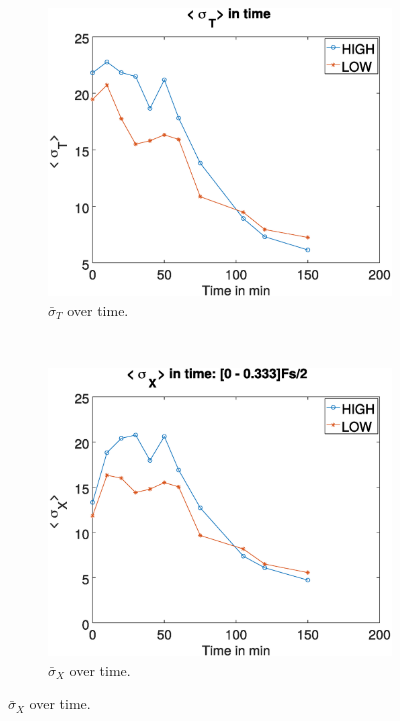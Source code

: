 \documentclass[review]{elsarticle}
\begin{document}
\begin{figure}[h!]
    \centering
    \begin{subfigure}[b]{0.475\textwidth}
        \includegraphics[width=\textwidth]{std-all.eps}
	\caption{$\bar{\sigma}_T$ over time.}
        \label{fig:allink}
    \end{subfigure}
    ~
    \begin{subfigure}[b]{0.475\textwidth}
        \includegraphics[width=\textwidth]{std-bandx.eps}
	\caption{$\bar{\sigma}_X$ over time.}
        \label{fig:stdxink}

\end{subfigure}
\end{figure}
\end{document}
